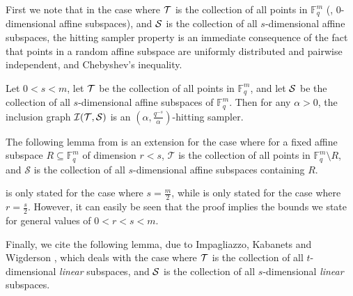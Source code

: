 \documentclass{toc}
\theoremstyle{plain}
\newcommand{\F}{{\mathbb{F}}}
\newcommand{\calI}{{\mathcal{I}}}
\begin{document}
 First we note that in the case where $\cal T$ is the collection of all points in $\F_q^m$ (\ie, $0$-dimensional affine subspaces), and $\cal S$ is the collection of all $s$-dimensional affine subspaces, the hitting sampler property is an immediate consequence of the fact that points in a random affine subspace are uniformly distributed and pairwise independent, and Chebyshev's inequality.

 
\begin{lemma}\label{lem:sampling-1-s}%
Let $0<s<m$, let $\cal T$ be the collection of all points in $\F_q^m$, and let $\cal S$ be the collection of all $s$-dimensional affine subspaces of $\F_q^m$. Then for any $\alpha >0$, 
 the inclusion graph $\calI(\cal T, \cal S)$ is an $(\alpha, \frac{q^{-s}} {\alpha})$-hitting sampler.
 \end{lemma}
 
The following lemma from \cite{ImpagliazzoJKW2010}
 is an extension for the case where for a fixed affine subspace $R \subseteq \F_q^m$ of dimension $r<s$, $\mathcal T$ is the collection of all points in $\F_q^m \setminus R$, and $\mathcal S$ is the collection of all $s$-dimensional affine subspaces containing $R$.
  
 
 \begin{remark}
\cite[Lemma 2.11]{ImpagliazzoJKW2010} is only stated for the case where $s = \frac m 2$, while \cite[Lemma 2.12]{ImpagliazzoJKW2010}
is only stated for the case where $r = \frac{s} {2}$. However, it can easily be seen that the proof implies the bounds we state for general values of $0<r<s<m$.
 \end{remark}

Finally, we cite the following lemma, %
due to Impagliazzo, Kabanets and Wigderson \cite{ImpagliazzoKW2012}, which deals with the case where $\cal T$ is the collection of all $t$-dimensional \emph{linear} subspaces, and $\cal S$ is the collection of  all $s$-dimensional \emph{linear} subspaces.
\end{document}
